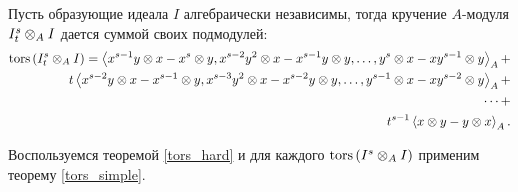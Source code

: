     \begin{Theorem}
        Пусть образующие идеала $I$ алгебраически независимы, тогда кручение $A$-модуля $I^s_t \otimes_A I$ дается суммой своих подмодулей:
        \begin{equation*}
            \begin{split}
                \textup{tors}\left(I^s_t \otimes_A I\right) = \left<x^{s-1}y \otimes x - x^s\otimes y, x^{s-2}y^2\otimes x - x^{s-1}y\otimes y, \dots , y^s \otimes x - xy^{s - 1} \otimes y\right>_A + \\
                t\left<x^{s-2}y \otimes x - x^{s-1}\otimes y, x^{s-3}y^2\otimes x - x^{s-2}y\otimes y, \dots , y^{s-1} \otimes x - xy^{s - 2} \otimes y\right>_A + \\
                \dots + \\
                t^{s-1}\left<x\otimes y - y\otimes x\right>_A.
            \end{split}
        \end{equation*}
    \end{Theorem}
    \begin{Proof}
        Воспользуемся теоремой \ref{tors_hard} и для каждого $\textup{tors}\left(I^s \otimes_A I\right)$ применим теорему
        \ref{tors_simple}.
    \end{Proof}

